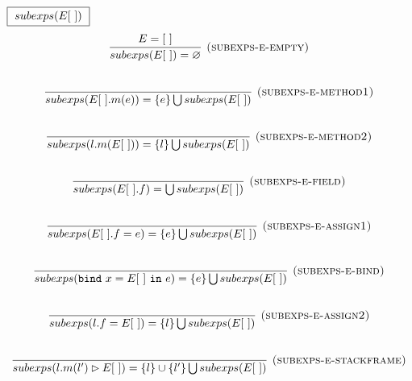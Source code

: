 \documentclass{llncs}
\newcommand{\keywadj}[1]{\mathtt{#1}}
\newcommand{\keyw}[1]{\keywadj{#1}~}
\begin{document}
%  
%
%  
%
%

$\fbox{$~subexps(E[~])~$}$
\[
\begin{array}{c}
\infer[\textsc{(subexps-e-empty)}]
  {subexps(E[~]) = \varnothing}
  {E = [~]}\\[5ex]
\infer[\textsc{(subexps-e-method1)}]
  {subexps(E[~].m(e)) = \{ e \} \bigcup subexps(E[~])}
  {}\\[5ex]
  
\infer[\textsc{(subexps-e-method2)}]
  {subexps(l.m(E[~])) = \{ l \} \bigcup subexps(E[~])}
  {}\\[5ex]
\infer[\textsc{(subexps-e-field)}]
  {subexps(E[~].f) = \bigcup subexps(E[~])}
  {}\\[5ex]

\infer[\textsc{(subexps-e-assign1)}]
  {subexps(E[~].f = e) = \{ e \} \bigcup subexps(E[~])}
  {}\\[5ex]
\infer[\textsc{(subexps-e-bind)}]
  {subexps(\keyw{bind} x = E[~]~\keyw{in} e) = \{ e \} \bigcup subexps(E[~])}
  {}\\[5ex]  

\infer[\textsc{(subexps-e-assign2)}]
  {subexps(l.f = E[~]) = \{ l \} \bigcup subexps(E[~])}
  {}\\[5ex]
\infer[\textsc{(subexps-e-stackframe)}]
  {subexps(l.m(l') \rhd E[~]) = \{ l \} \cup \{ l' \} \bigcup subexps(E[~])}
  {}\\[5ex]
\end{array}
\]
\end{document}
